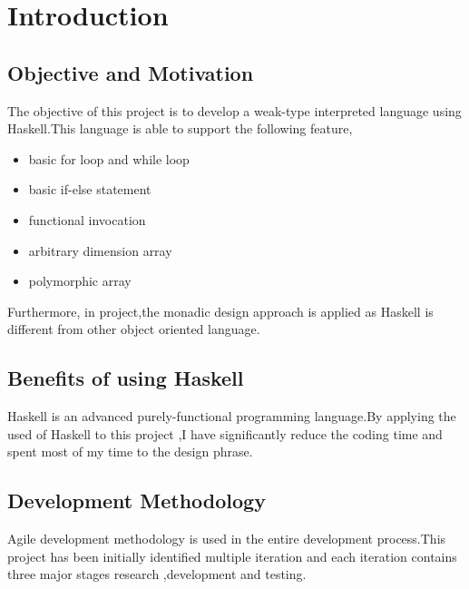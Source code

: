 \chapter{Introduction}
\section{Objective and Motivation}
The objective of this project is to develop a weak-type interpreted language using Haskell.This language is able to support the following feature,
\begin{itemize}
\item basic for loop and while loop
\item basic if-else statement
\item functional invocation 
\item arbitrary dimension array
\item polymorphic array
\end{itemize}

Furthermore, in project,the monadic design approach is applied as Haskell is different from other object oriented language.

\section{Benefits of using Haskell} 
Haskell is an advanced purely-functional programming language.By applying the used of Haskell to this project ,I have significantly reduce the coding time and spent most of my time to the design phrase.


\section{Development Methodology}
Agile development methodology is used in the entire development process.This project has been initially identified multiple iteration and each iteration contains three major stages research ,development and testing.